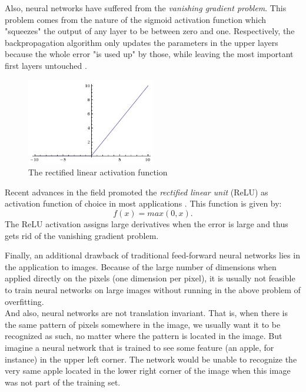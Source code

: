 \documentclass[11pt,a4paper]{article}
\begin{document}
Also, neural networks have suffered from the \textit{vanishing gradient problem}. This problem comes from the nature of the sigmoid activation function which "squeezes" the output of any layer to be between zero and one. Respectively, the backpropagation algorithm only updates the parameters in the upper layers because the whole error "is used up" by those, while leaving the most important first layers untouched \cite{hochreiter1991}.
\begin{figure}
	\vspace{-1pt}
	\begin{center}
		\includegraphics[width=0.5\textwidth]{relu.jpeg}
	\end{center}
	\vspace{-1pt}
	\caption{The rectified linear activation function}
	\vspace{-1pt}
	\label{fig:relu}
\end{figure}
Recent advances in the field promoted the \textit{rectified linear unit} (ReLU) as activation function of choice in most applications \cite{hahnloser2000digital}. This function is given by:
\begin{equation*}
f(x) = max(0, x).
\end{equation*}
The ReLU activation assigns large derivatives when the error is large and thus gets rid of the vanishing gradient problem.

Finally, an additional drawback of traditional feed-forward neural networks lies in the application to images. Because of the large number of dimensions when applied directly on the pixels (one dimension per pixel), it is usually not feasible to train neural networks on large images without running in the above problem of overfitting.\\
And also, neural networks are not translation invariant. That is, when there is the same pattern of pixels somewhere in the image, we usually want it to be recognized as such, no matter where the pattern is located in the image. But imagine a neural network that is trained to see some feature (an apple, for instance) in the upper left corner. The network would be unable to recognize the very same apple located in the lower right corner of the image when this image was not part of the training set.
\end{document}
